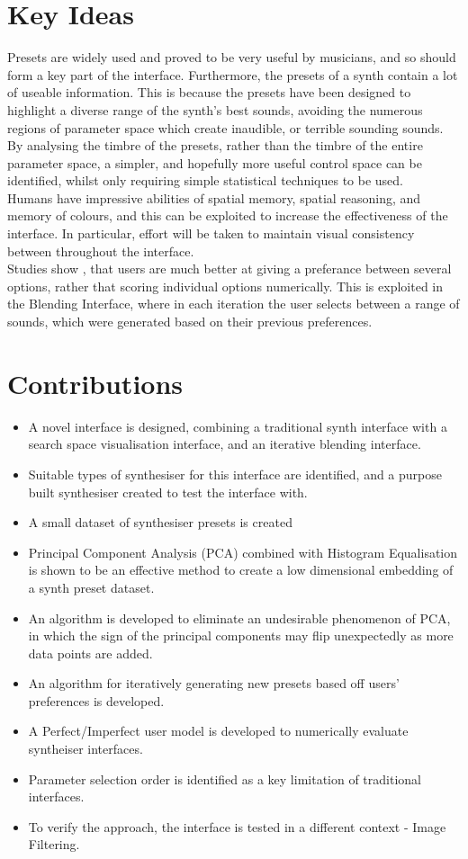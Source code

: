\documentclass[11pt, oneside]{report}   	%
\begin{document}
\section{Key Ideas}
Presets are widely used and proved to be very useful by musicians, and so should form a key part of the interface. Furthermore, the presets of a synth contain a lot of useable information. This is because the presets have been designed to highlight a diverse range of the synth's best sounds, avoiding the numerous regions of parameter space which create inaudible, or terrible sounding sounds. By analysing the timbre of the presets, rather than the timbre of the entire parameter space, a simpler, and hopefully more useful control space can be identified, whilst only requiring simple statistical techniques to be used.\\
%
Humans have impressive abilities of spatial memory, spatial reasoning, and memory of colours, and this can be exploited to increase the effectiveness of the interface. In particular, effort will be taken to maintain visual consistency between throughout the interface.\\
%
Studies show \cite{RatingRanking}, that users are much better at giving a preferance between several options, rather that scoring individual options numerically. This is exploited in the Blending Interface, where in each iteration the user selects between a range of sounds, which were generated based on their previous preferences.
%
\section{Contributions}
\begin{itemize}
	\setlength\itemsep{-1.0em}
	\item A novel interface is designed, combining a traditional synth interface with a search space visualisation interface, and an iterative blending interface.
	\item Suitable types of synthesiser for this interface are identified, and a purpose built synthesiser created to test the interface with.
	\item A small dataset of synthesiser presets is created
	\item Principal Component Analysis (PCA) combined with Histogram Equalisation is shown to be an effective method to create a low dimensional embedding of a synth preset dataset.
	\item An algorithm is developed to eliminate an undesirable phenomenon of PCA, in which the sign of the principal components may flip unexpectedly as more data points are added.
	\item An algorithm for iteratively generating new presets based off users' preferences is developed.
	\item A Perfect/Imperfect user model is developed to numerically evaluate syntheiser interfaces.
	\item Parameter selection order is identified as a key limitation of traditional interfaces.
	\item To verify the approach, the interface is tested in a different context - Image Filtering.
\end{itemize}
\end{document}
